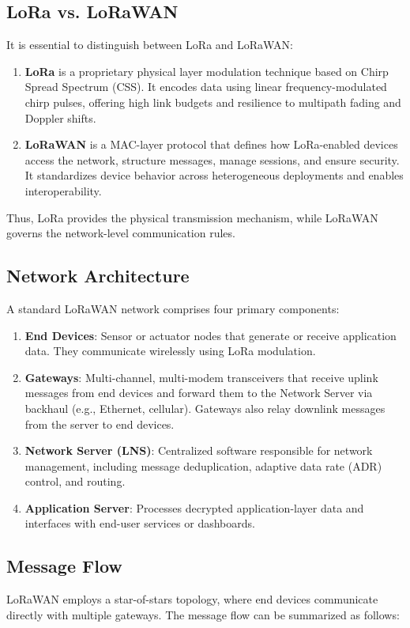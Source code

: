 \subsection{LoRa vs. LoRaWAN}
It is essential to distinguish between LoRa and LoRaWAN:
\begin{enumerate}
    \item \textbf{LoRa} is a proprietary physical layer modulation technique based on Chirp Spread Spectrum (CSS). It encodes data using linear frequency-modulated chirp pulses, offering high link budgets and resilience to multipath fading and Doppler shifts.
    \item \textbf{LoRaWAN} is a MAC-layer protocol that defines how LoRa-enabled devices access the network, structure messages, manage sessions, and ensure security. It standardizes device behavior across heterogeneous deployments and enables interoperability.
\end{enumerate}
Thus, LoRa provides the physical transmission mechanism, while LoRaWAN governs the network-level communication rules.

\subsection{Network Architecture}
A standard LoRaWAN network comprises four primary components:

\begin{enumerate}
    \item \textbf{End Devices}: Sensor or actuator nodes that generate or receive application data. They communicate wirelessly using LoRa modulation.
    \item \textbf{Gateways}: Multi-channel, multi-modem transceivers that receive uplink messages from end devices and forward them to the Network Server via backhaul (e.g., Ethernet, cellular). Gateways also relay downlink messages from the server to end devices.
    \item \textbf{Network Server (LNS)}: Centralized software responsible for network management, including message deduplication, adaptive data rate (ADR) control, and routing.
    \item \textbf{Application Server}: Processes decrypted application-layer data and interfaces with end-user services or dashboards.
\end{enumerate}

\subsection{Message Flow}
LoRaWAN employs a star-of-stars topology, where end devices communicate directly with multiple gateways. The message flow can be summarized as follows:

